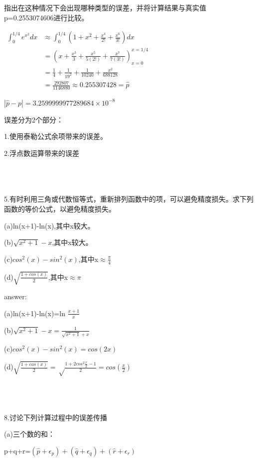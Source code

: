 \documentclass[UTF8]{ctexart}
\begin{document}
指出在这种情况下会出现哪种类型的误差，并将计算结果与真实值p=0.2553074606进行比较。


$\begin{aligned} \int_{0}^{1 / 4} e^{x^{2}} d x & \approx \int_{0}^{1 / 4}\left(1+x^{2}+\frac{x^{4}}{2 !}+\frac{x^{6}}{3 !}\right) d x \\ 
&=\left(x+\frac{x^{3}}{3}+\frac{x^{5}}{5(2 !)}+\frac{x^{7}}{7(3 !)}\right)_{x=0}^{x=1 / 4} \\ 
&=\frac{1}{4}+\frac{1}{19^{2}}+\frac{1}{10240}+\frac{x^{2}}{688128} \\ 
&=\frac{292807}{1146880} \approx 0.255307428=\hat{p} 
\end{aligned}$


$ | \hat{p}-p |=3.2599999977289684 \times 10^{-8}$

误差分为2个部分：

\quad1.使用泰勒公式余项带来的误差。

\quad2.浮点数运算带来的误差


~\\ 
~\\
~\\

5.有时利用三角或代数恒等式，重新排列函数中的项，可以避免精度损失。求下列函数的等价公式，以避免精度损失。

(a)ln(x+1)-ln(x),其中x较大。

(b)$ \sqrt{x^2+1} - x$,其中x较大。

(c)$ cos^2 (x) - sin^2 (x)$,其中x$\approx \frac{\pi}{4}$ 

(d)$ \sqrt{\frac{1+cos(x)}{2}} $,其中x$\approx \pi$ 

answer:


\quad (a)ln(x+1)-ln(x)=ln $ \frac{x+1}{x}$

\quad (b)$ \sqrt{x^2+1} - x = \frac{1}{\sqrt{x^2+1}+x}  $

\quad (c)$ cos^2 (x) - sin^2 (x) = cos (2x)$

\quad (d)$ \sqrt{\frac{1+cos(x)}{2}} = \sqrt\frac{{1+2cos^2 \frac{x}{2} -1}}{2}  = cos(\frac{x}{2})$



~\\ 
~\\
~\\

8.讨论下列计算过程中的误差传播

(a)三个数的和：

\quad \quad p+q+r=$(\hat{p}+\epsilon_{p})+(\hat{q}+\epsilon_{q})+(\hat{r}+\epsilon_{r}) $
\end{document}
